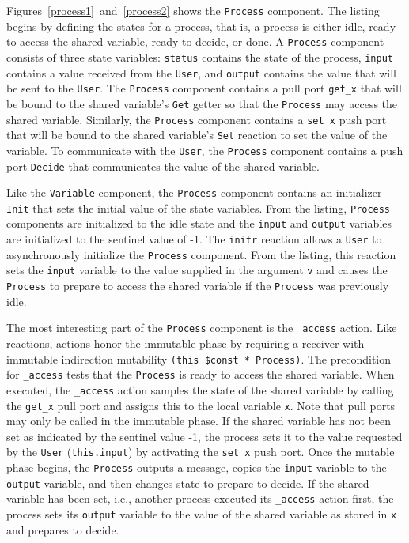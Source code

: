 Figures~\ref{process1}~and~\ref{process2} shows the \verb+Process+ component.
The listing begins by defining the states for a process, that is, a process is either idle, ready to access the shared variable, ready to decide, or done.
A \verb+Process+ component consists of three state variables:  \verb+status+ contains the state of the process, \verb+input+ contains a value received from the \verb+User+, and \verb+output+ contains the value that will be sent to the \verb+User+.
The \verb+Process+ component contains a pull port \verb+get_x+ that will be bound to the shared variable's \verb+Get+ getter so that the \verb+Process+ may access the shared variable.
Similarly, the \verb+Process+ component contains a \verb+set_x+ push port that will be bound to the shared variable's \verb+Set+ reaction to set the value of the variable.
To communicate with the \verb+User+, the \verb+Process+ component contains a push port \verb+Decide+ that communicates the value of the shared variable.

Like the \verb+Variable+ component, the \verb+Process+ component contains an initializer \verb+Init+ that sets the initial value of the state variables.
From the listing, \verb+Process+ components are initialized to the idle state and the \verb+input+ and \verb+output+ variables are initialized to the sentinel value of -1.
The \verb+initr+ reaction allows a \verb+User+ to asynchronously initialize the \verb+Process+ component.
From the listing, this reaction sets the \verb+input+ variable to the value supplied in the argument \verb+v+ and causes the \verb+Process+ to prepare to access the shared variable if the \verb+Process+ was previously idle.

The most interesting part of the \verb+Process+ component is the \verb+_access+ action.
Like reactions, actions honor the immutable phase by requiring a receiver with immutable indirection mutability \verb+(this $const * Process)+.
The precondition for \verb+_access+ tests that the \verb+Process+ is ready to access the shared variable.
When executed, the \verb+_access+ action samples the state of the shared variable by calling the \verb+get_x+ pull port and assigns this to the local variable \verb+x+.
Note that pull ports may only be called in the immutable phase.
If the shared variable has not been set as indicated by the sentinel value -1, the process sets it to the value requested by the \verb+User+ (\verb+this.input+) by activating the \verb+set_x+ push port.
Once the mutable phase begins, the \verb+Process+ outputs a message, copies the \verb+input+ variable to the \verb+output+ variable, and then changes state to prepare to decide.
If the shared variable has been set, i.e., another process executed its \verb+_access+ action first, the process sets its \verb+output+ variable to the value of the shared variable as stored in \verb+x+ and prepares to decide.

